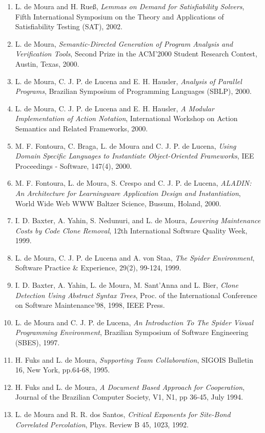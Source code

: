 \documentclass{article}
\begin{document}
\begin{enumerate}
\item L. de Moura and H. Rue\ss,
{\em Lemmas on Demand for Satisfiability Solvers},
Fifth  International Symposium on the Theory and Applications of Satisfiability Testing (SAT), 2002.

\item L. de Moura,
{\em Semantic-Directed Generation of Program Analysis and Verification Tools},
Second Prize in the ACM'2000 Student Research Contest, Austin, Texas, 2000.

\item L. de Moura, C. J. P. de Lucena and E. H. Hausler,
{\em Analysis of Parallel Programs},
Brazilian Symposium of Programming Languages (SBLP), 2000.

\item L. de Moura, C. J. P. de Lucena and E. H. Hausler,
{\em A Modular Implementation of Action Notation},
International Workshop on Action Semantics and Related Frameworks, 2000.

\item M. F. Fontoura, C. Braga, L. de Moura and C. J. P. de Lucena,
{\em Using Domain Specific Languages to Instantiate Object-Oriented Frameworks},
IEE Proceedings - Software, 147(4), 2000.

\item M. F. Fontoura, L. de Moura, S. Crespo and C. J. P. de Lucena,
{\em ALADIN: An Architecture for Learningware Application Design and Instantiation},
World Wide Web WWW Baltzer Science, Bussum, Holand, 2000.

\item I. D. Baxter, A. Yahin, S. Nedunuri, and L. de Moura,
{\em Lowering Maintenance Costs by Code Clone Removal},
12th International Software Quality Week, 1999.

\item L. de Moura, C. J. P. de Lucena and A. von Staa,
{\em The Spider Environment},
Software Practice \& Experience, 29(2), 99-124, 1999.

\item I. D. Baxter, A. Yahin, L. de Moura, M. Sant'Anna and L. Bier,
{\em Clone Detection Using Abstract Syntax Trees},
Proc. of the International Conference on Software Maintenance'98, 1998, IEEE Press.

\item L. de Moura and C. J. P. de Lucena,
{\em An Introduction To The Spider Visual Programming Environment},
Brazilian Symposium of Software Engineering (SBES), 1997.

\item H. Fuks and L. de Moura,
{\em Supporting Team Collaboration},
SIGOIS Bulletin 16, New York, pp.64-68, 1995.

\item H. Fuks and L. de Moura,
{\em A Document Based Approach for Cooperation},
Journal of the Brazilian Computer Society, V1, N1, pp 36-45, July 1994.

\item L. de Moura and R. R. dos Santos,
{\em Critical Exponents for Site-Bond Correlated Percolation},
Phys. Review B 45, 1023, 1992.
\end{enumerate}
\end{document}
